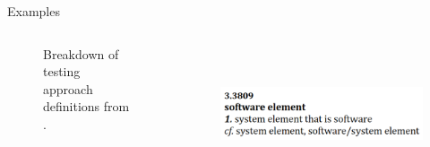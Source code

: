 \documentclass[22pt]{beamer}
\begin{document}
\begin{frame}[fragile]
\begin{textblock}{7.25}
\begin{block}{\fontsize{37}{20}\selectfont Examples}
            \begin{columns}
                \begin{column}{0.4\textwidth}
                    \begin{center}
                        \begin{figure}
                            \label{Fig:IEEEdefs}
                            \caption{Breakdown of testing approach definitions from \cite{IEEE2022}.}
                        \end{figure}
                    \end{center}
                \end{column}
                \begin{column}{0.4\textwidth}
                    \begin{center}
                        \begin{figure}
                            \includegraphics[height=4cm]{software element.png}

                            \vspace{2mm}


\end{figure}
\end{center}
\end{column}
\end{columns}
\end{block}
\end{textblock}
\end{frame}
\end{document}
